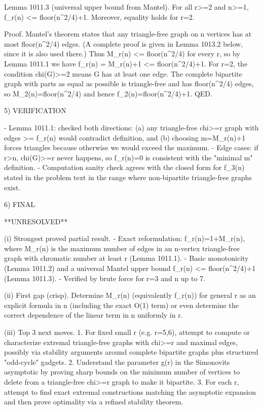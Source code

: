Lemma 1011.3 (universal upper bound from Mantel).
For all r>=2 and n>=1,
  f_r(n) <= floor(n^2/4)+1.
Moreover, equality holds for r=2.

Proof.
Mantel's theorem states that any triangle-free graph on n vertices has at most floor(n^2/4) edges. (A complete proof is given in Lemma 1013.2 below, since it is also used there.)
Thus M_r(n) <= floor(n^2/4) for every r, so by Lemma 1011.1 we have f_r(n) = M_r(n)+1 <= floor(n^2/4)+1.
For r=2, the condition chi(G)>=2 means G has at least one edge. The complete bipartite graph with parts as equal as possible is triangle-free and has floor(n^2/4) edges, so M_2(n)=floor(n^2/4) and hence f_2(n)=floor(n^2/4)+1.
QED.

5) VERIFICATION

- Lemma 1011.1: checked both directions: (a) any triangle-free chi>=r graph with edges >= f_r(n) would contradict definition, and (b) choosing m=M_r(n)+1 forces triangles because otherwise we would exceed the maximum.
- Edge cases: if r>n, chi(G)>=r never happens, so f_r(n)=0 is consistent with the "minimal m" definition.
- Computation sanity check agrees with the closed form for f_3(n) stated in the problem text in the range where non-bipartite triangle-free graphs exist.

6) FINAL

**UNRESOLVED**

(i) Strongest proved partial result.
- Exact reformulation: f_r(n)=1+M_r(n), where M_r(n) is the maximum number of edges in an n-vertex triangle-free graph with chromatic number at least r (Lemma 1011.1).
- Basic monotonicity (Lemma 1011.2) and a universal Mantel upper bound f_r(n) <= floor(n^2/4)+1 (Lemma 1011.3).
- Verified by brute force for r=3 and n up to 7.

(ii) First gap (crisp).
Determine M_r(n) (equivalently f_r(n)) for general r as an explicit formula in n (including the exact O(1) term) or even determine the correct dependence of the linear term in n uniformly in r.

(iii) Top 3 next moves.
1. For fixed small r (e.g. r=5,6), attempt to compute or characterize extremal triangle-free graphs with chi>=r and maximal edges, possibly via stability arguments around complete bipartite graphs plus structured "odd-cycle" gadgets.
2. Understand the parameter g(r) in the Simonovits asymptotic by proving sharp bounds on the minimum number of vertices to delete from a triangle-free chi>=r graph to make it bipartite.
3. For each r, attempt to find exact extremal constructions matching the asymptotic expansion and then prove optimality via a refined stability theorem.

